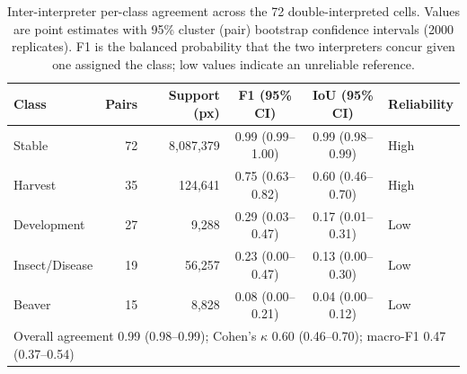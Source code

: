 \begin{table}[t]
\centering
\caption{Inter-interpreter per-class agreement across the 72 double-interpreted cells. Values are point estimates with 95\% cluster (pair) bootstrap confidence intervals (2000 replicates). F1 is the balanced probability that the two interpreters concur given one assigned the class; low values indicate an unreliable reference.}
\label{tab:interpreter_agreement}
\begin{tabular}{lrrccl}
\toprule
Class & Pairs & Support (px) & F1 (95\% CI) & IoU (95\% CI) & Reliability \\
\midrule
Stable & 72 & 8,087,379 & 0.99 (0.99--1.00) & 0.99 (0.98--0.99) & High \\
Harvest & 35 & 124,641 & 0.75 (0.63--0.82) & 0.60 (0.46--0.70) & High \\
Development & 27 & 9,288 & 0.29 (0.03--0.47) & 0.17 (0.01--0.31) & Low \\
Insect/Disease & 19 & 56,257 & 0.23 (0.00--0.47) & 0.13 (0.00--0.30) & Low \\
Beaver & 15 & 8,828 & 0.08 (0.00--0.21) & 0.04 (0.00--0.12) & Low \\
\midrule
\multicolumn{6}{l}{Overall agreement 0.99 (0.98--0.99); Cohen's $\kappa$ 0.60 (0.46--0.70); macro-F1 0.47 (0.37--0.54)} \\
\bottomrule
\end{tabular}
\end{table}
